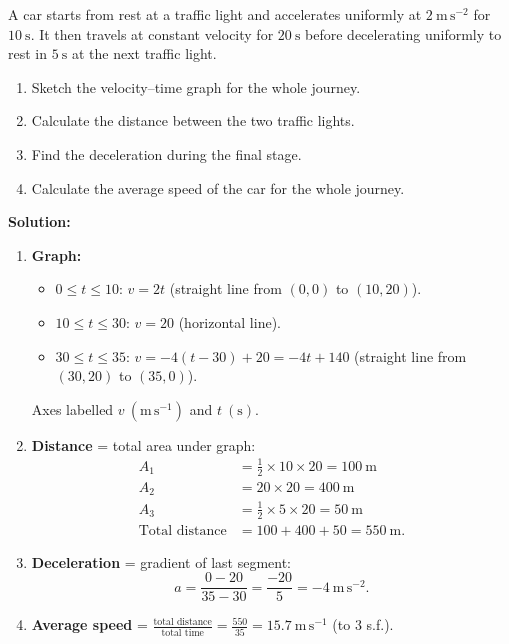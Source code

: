 \documentclass[11pt]{article}
\begin{document}
\begin{exoresolu}
A car starts from rest at a traffic light and accelerates uniformly at $2\ \mathrm{m\,s^{-2}}$ for $10\ \mathrm{s}$. It then travels at constant velocity for $20\ \mathrm{s}$ before decelerating uniformly to rest in $5\ \mathrm{s}$ at the next traffic light.
\begin{enumerate}
\item Sketch the velocity–time graph for the whole journey.
\item Calculate the distance between the two traffic lights.
\item Find the deceleration during the final stage.
\item Calculate the average speed of the car for the whole journey.
\end{enumerate}
\tcblower
\textbf{Solution:}
\begin{enumerate}
\item \textbf{Graph:}
\begin{itemize}
\item $0 \le t \le 10$: $v = 2t$ (straight line from $(0,0)$ to $(10,20)$).
\item $10 \le t \le 30$: $v = 20$ (horizontal line).
\item $30 \le t \le 35$: $v = -4(t-30)+20 = -4t+140$ (straight line from $(30,20)$ to $(35,0)$).
\end{itemize}
Axes labelled $v\ (\mathrm{m\,s^{-1}})$ and $t\ (\mathrm{s})$.
\item \textbf{Distance} = total area under graph:
\begin{align*}
A_1 &= \tfrac{1}{2} \times 10 \times 20 = 100\ \mathrm{m} \\
A_2 &= 20 \times 20 = 400\ \mathrm{m} \\
A_3 &= \tfrac{1}{2} \times 5 \times 20 = 50\ \mathrm{m} \\
\text{Total distance} &= 100 + 400 + 50 = 550\ \mathrm{m}.
\end{align*}
\item \textbf{Deceleration} = gradient of last segment:
\[
a = \frac{0 - 20}{35 - 30} = \frac{-20}{5} = -4\ \mathrm{m\,s^{-2}}.
\]
\item \textbf{Average speed} = $\frac{\text{total distance}}{\text{total time}} = \frac{550}{35} = 15.7\ \mathrm{m\,s^{-1}}$ (to 3 s.f.).
\end{enumerate}
\end{exoresolu}
\end{document}
